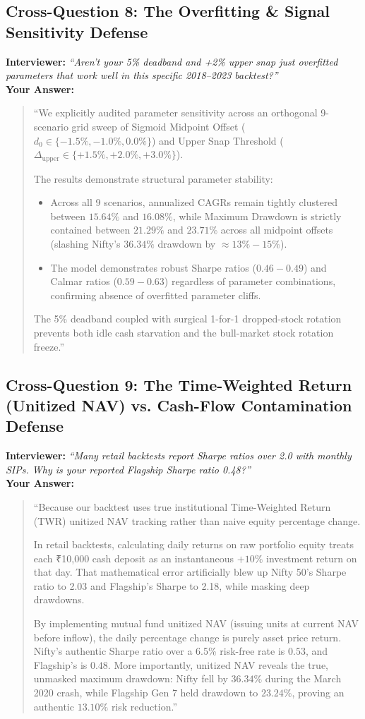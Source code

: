 \documentclass[11pt,a4paper]{article}
\begin{document}
\subsection{Cross-Question 8: The Overfitting \& Signal Sensitivity Defense}
\textbf{Interviewer:} \textit{``Aren't your 5\% deadband and +2\% upper snap just overfitted parameters that work well in this specific 2018--2023 backtest?''} \\
\textbf{Your Answer:}
\begin{quote}
``We explicitly audited parameter sensitivity across an orthogonal 9-scenario grid sweep of Sigmoid Midpoint Offset ($d_0 \in \{-1.5\%, -1.0\%, 0.0\%\}$) and Upper Snap Threshold ($\Delta_{\text{upper}} \in \{+1.5\%, +2.0\%, +3.0\%\}$).

The results demonstrate structural parameter stability:
\begin{itemize}
    \item Across all 9 scenarios, annualized CAGRs remain tightly clustered between $15.64\%$ and $16.08\%$, while Maximum Drawdown is strictly contained between $21.29\%$ and $23.71\%$ across all midpoint offsets (slashing Nifty's $36.34\%$ drawdown by $\approx 13\%-15\%$).
    \item The model demonstrates robust Sharpe ratios ($0.46 - 0.49$) and Calmar ratios ($0.59 - 0.63$) regardless of parameter combinations, confirming absence of overfitted parameter cliffs.
\end{itemize}
The 5\% deadband coupled with surgical 1-for-1 dropped-stock rotation prevents both idle cash starvation and the bull-market stock rotation freeze.''
\end{quote}

\subsection{Cross-Question 9: The Time-Weighted Return (Unitized NAV) vs. Cash-Flow Contamination Defense}
\textbf{Interviewer:} \textit{``Many retail backtests report Sharpe ratios over 2.0 with monthly SIPs. Why is your reported Flagship Sharpe ratio 0.48?''} \\
\textbf{Your Answer:}
\begin{quote}
``Because our backtest uses true institutional Time-Weighted Return (TWR) unitized NAV tracking rather than naive equity percentage change. 

In retail backtests, calculating daily returns on raw portfolio equity treats each ₹10,000 cash deposit as an instantaneous $+10\%$ investment return on that day. That mathematical error artificially blew up Nifty 50's Sharpe ratio to 2.03 and Flagship's Sharpe to 2.18, while masking deep drawdowns.

By implementing mutual fund unitized NAV (issuing units at current NAV before inflow), the daily percentage change is purely asset price return. Nifty's authentic Sharpe ratio over a 6.5\% risk-free rate is $0.53$, and Flagship's is $0.48$. More importantly, unitized NAV reveals the true, unmasked maximum drawdown: Nifty fell by $36.34\%$ during the March 2020 crash, while Flagship Gen 7 held drawdown to $23.24\%$, proving an authentic $13.10\%$ risk reduction.''
\end{quote}
\end{document}
